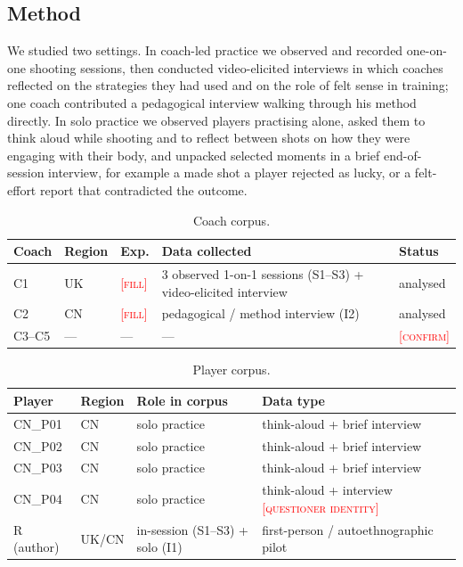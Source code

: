 \documentclass[sigconf]{acmart}
\newcommand{\vf}[1]{\textcolor{red}{[\textsc{#1}]}}
\begin{document}
\subsection{Method}

We studied two settings. In coach-led practice we observed and recorded one-on-one shooting sessions, then conducted video-elicited interviews in which coaches reflected on the strategies they had used and on the role of felt sense in training; one coach contributed a pedagogical interview walking through his method directly. In solo practice we observed players practising alone, asked them to think aloud while shooting and to reflect between shots on how they were engaging with their body, and unpacked selected moments in a brief end-of-session interview, for example a made shot a player rejected as lucky, or a felt-effort report that contradicted the outcome.

\begin{table}[t]
\footnotesize
\caption{Coach corpus.}
\label{tab:coaches}
\begin{tabular}{@{}llp{1.1cm}p{2.4cm}l@{}}
\toprule
Coach & Region & Exp. & Data collected & Status \\
\midrule
C1 & UK & \vf{fill} & 3 observed 1-on-1 sessions (S1--S3) + video-elicited interview & analysed \\
C2 & CN & \vf{fill} & pedagogical / method interview (I2) & analysed \\
C3--C5 & --- & --- & --- & \vf{confirm} \\
\bottomrule
\end{tabular}
\end{table}

\begin{table}[t]
\footnotesize
\caption{Player corpus.}
\label{tab:players}
\begin{tabular}{@{}llp{2.2cm}p{2.4cm}@{}}
\toprule
Player & Region & Role in corpus & Data type \\
\midrule
CN\_P01 & CN & solo practice & think-aloud + brief interview \\
CN\_P02 & CN & solo practice & think-aloud + brief interview \\
CN\_P03 & CN & solo practice & think-aloud + brief interview \\
CN\_P04 & CN & solo practice & think-aloud + interview \vf{questioner identity} \\
R (author) & UK/CN & in-session (S1--S3) + solo (I1) & first-person / autoethnographic pilot \\
\bottomrule
\end{tabular}
\end{table}
\end{document}
